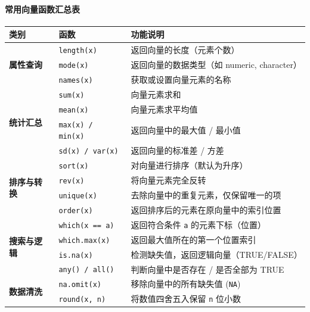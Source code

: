 \paragraph{常用向量函数汇总表}
\begin{table}[h]
\centering
\renewcommand{\arraystretch}{1.4}
\small %
\begin{tabular}{|l|l|p{7cm}|}
\hline
\textbf{类别} & \textbf{函数} & \textbf{功能说明} \\ \hline
\multirow{3}{*}{\textbf{属性查询}} & \texttt{length(x)} & 返回向量的长度（元素个数） \\ \cline{2-3} 
 & \texttt{mode(x)} & 返回向量的数据类型（如 numeric, character） \\ \cline{2-3} 
 & \texttt{names(x)} & 获取或设置向量元素的名称 \\ \hline
\multirow{4}{*}{\textbf{统计汇总}} & \texttt{sum(x)} & 向量元素求和 \\ \cline{2-3} 
 & \texttt{mean(x)} & 向量元素求平均值 \\ \cline{2-3} 
 & \texttt{max(x) / min(x)} & 返回向量中的最大值 / 最小值 \\ \cline{2-3} 
 & \texttt{sd(x) / var(x)} & 返回向量的标准差 / 方差 \\ \hline
\multirow{4}{*}{\textbf{排序与转换}} & \texttt{sort(x)} & 对向量进行排序（默认为升序） \\ \cline{2-3} 
 & \texttt{rev(x)} & 将向量元素完全反转 \\ \cline{2-3} 
 & \texttt{unique(x)} & 去除向量中的重复元素，仅保留唯一的项 \\ \cline{2-3} 
 & \texttt{order(x)} & 返回排序后的元素在原向量中的索引位置 \\ \hline
\multirow{4}{*}{\textbf{搜索与逻辑}} & \texttt{which(x == a)} & 返回符合条件 \texttt{a} 的元素下标（位置） \\ \cline{2-3} 
 & \texttt{which.max(x)} & 返回最大值所在的第一个位置索引 \\ \cline{2-3} 
 & \texttt{is.na(x)} & 检测缺失值，返回逻辑向量（TRUE/FALSE） \\ \cline{2-3} 
 & \texttt{any() / all()} & 判断向量中是否存在 / 是否全部为 TRUE \\ \hline
\multirow{2}{*}{\textbf{数据清洗}} & \texttt{na.omit(x)} & 移除向量中的所有缺失值 (\texttt{NA}) \\ \cline{2-3} 
 & \texttt{round(x, n)} & 将数值四舍五入保留 \texttt{n} 位小数 \\ \hline
\end{tabular}
\end{table}


